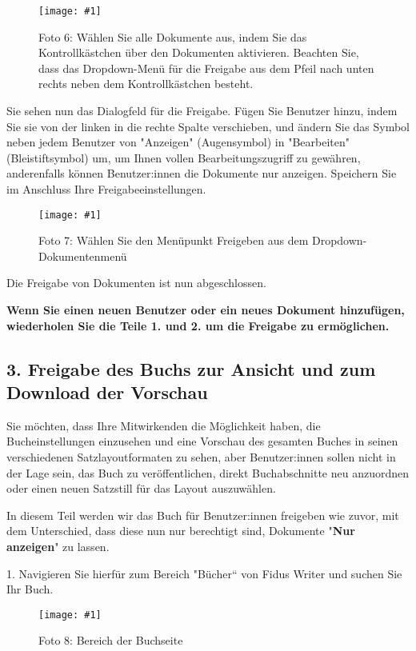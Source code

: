 \documentclass{article}
\newlength{\imgwidth}
\newcommand\scaledgraphics[2]{%
                
\settowidth{\imgwidth}{\texttt{[image: \#1]}}%
                
\setlength{\imgwidth}{\minof{\imgwidth}{#2\textwidth}}%
                
\texttt{[image: \#1]}%
                
}
\begin{document}
\begin{figure}
\scaledgraphics{4aaf5a28-7970-4f78-bb98-e1232313f54b.png}{1}
\caption*{Foto 6: Wählen Sie alle Dokumente aus, indem Sie das Kontrollkästchen über den Dokumenten aktivieren. Beachten Sie, dass das Dropdown-Menü für die Freigabe aus dem Pfeil nach unten rechts neben dem Kontrollkästchen besteht.}\label{F49894591}
\end{figure}


Sie sehen nun das Dialogfeld für die Freigabe. Fügen Sie Benutzer hinzu, indem Sie sie von der linken in die rechte Spalte verschieben, und ändern Sie das Symbol neben jedem Benutzer von "Anzeigen" (Augensymbol) in "Bearbeiten" (Bleistiftsymbol) um, um Ihnen vollen Bearbeitungszugriff zu gewähren, anderenfalls können Benutzer:innen die Dokumente nur anzeigen. Speichern Sie im Anschluss Ihre Freigabeeinstellungen.

\begin{figure}
\scaledgraphics{2b3de32d-4d3e-4e7c-9161-6d7d37b1c232.png}{1}
\caption*{Foto 7: Wählen Sie den Menüpunkt Freigeben aus dem Dropdown-Dokumentenmenü}\label{F11743441}
\end{figure}


Die Freigabe von Dokumenten ist nun abgeschlossen.


\textbf{Wenn Sie einen neuen Benutzer oder ein neues Dokument hinzufügen, wiederholen Sie die Teile 1. und 2. um die Freigabe zu ermöglichen.}


\subsection{3. Freigabe des Buchs zur Ansicht und zum Download der Vorschau}\label{H5996080}



Sie möchten, dass Ihre Mitwirkenden die Möglichkeit haben, die Bucheinstellungen einzusehen und eine Vorschau des gesamten Buches in seinen verschiedenen Satzlayoutformaten zu sehen, aber Benutzer:innen sollen nicht in der Lage sein, das Buch zu veröffentlichen, direkt Buchabschnitte neu anzuordnen oder einen neuen Satzstill für das Layout auszuwählen.


In diesem Teil werden wir das Buch für Benutzer:innen freigeben wie zuvor, mit dem Unterschied, dass diese nun nur berechtigt sind, Dokumente "\textbf{Nur anzeigen}" zu lassen.


1. Navigieren Sie hierfür zum Bereich "Bücher“ von Fidus Writer und suchen Sie Ihr Buch.

\begin{figure}
\scaledgraphics{a2dd5291-f50f-43c5-a251-a2696cf99f7c.png}{1}
\caption*{Foto 8: Bereich der Buchseite}\label{F10022161}
\end{figure}
\end{document}

